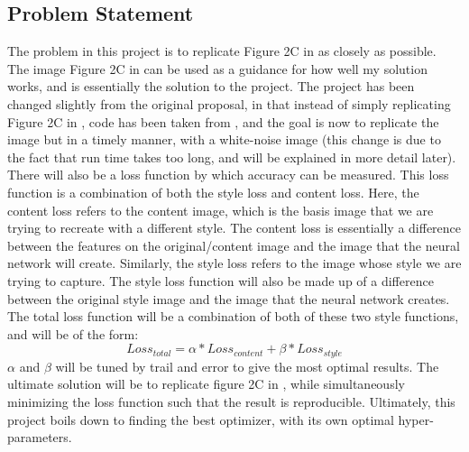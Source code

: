\documentclass[12pt]{article}
\begin{document}
\subsection{Problem Statement}
The problem in this project is to replicate Figure 2C in \cite{Neural} as closely as possible. The image Figure 2C in \cite{Neural} can be used as a guidance for how well my solution works, and is essentially the solution to the project. The project has been changed slightly from the original proposal, in that instead of simply replicating Figure 2C in \cite{Neural}, code has been taken from \cite{Github}, and the goal is now to replicate the image but in a timely manner, with a white-noise image (this change is due to the fact that run time takes too long, and will be explained in more detail later). There will also be a loss function by which accuracy can be measured. This loss function is a combination of both the style loss and content loss. Here, the content loss refers to the content image, which is the basis image that we are trying to recreate with a different style. The content loss is essentially a difference between the features on the original/content image and the  image that the neural network will create. Similarly, the style loss refers to the image whose style we are trying to capture. The style loss function will also be made up of a difference between the original style image and the image that the neural network creates. The total loss function will be a combination of both of these two style functions, and will be of the form:
\begin{equation}
Loss_{total} = \alpha * Loss_{content} + \beta * Loss_{style}
\end{equation}
$\alpha$ and $\beta$ will be tuned by trail and error to give the most optimal results. The ultimate solution will be to replicate figure 2C in \cite{Image}, while simultaneously minimizing the loss function such that the result is reproducible. Ultimately, this project boils down to finding the best optimizer, with its own optimal hyper-parameters.
\end{document}
